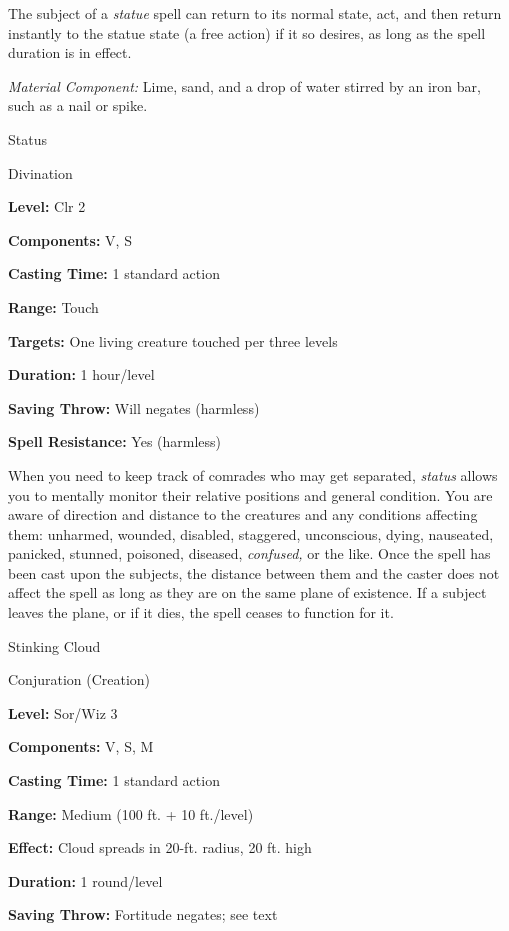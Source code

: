 \documentclass{article}
\begin{document}
The subject of a \textit{statue }spell can return to its normal state, act, and 
then return instantly to the statue state (a free action) if it so desires, as 
long as the spell duration is in effect.

\textit{Material Component: }Lime, sand, and a drop of water stirred by an iron 
bar, such as a nail or spike.

\vspace{12pt}
Status

Divination

\textbf{Level:} Clr 2

\textbf{Components:} V, S

\textbf{Casting Time:} 1 standard action

\textbf{Range:} Touch

\textbf{Targets:} One living creature touched per three levels

\textbf{Duration:} 1 hour/level

\textbf{Saving Throw: }Will negates (harmless)

\textbf{Spell Resistance:} Yes (harmless)

When you need to keep track of comrades who may get separated, \textit{status }allows 
you to mentally monitor their relative positions and general condition. You are 
aware of direction and distance to the creatures and any conditions affecting them: 
unharmed, wounded, disabled, staggered, unconscious, dying, nauseated, panicked, 
stunned, poisoned, diseased, \textit{confused, }or the like. Once the spell has 
been cast upon the subjects, the distance between them and the caster does not 
affect the spell as long as they are on the same plane of existence. If a subject 
leaves the plane, or if it dies, the spell ceases to function for it.

\vspace{12pt}
Stinking Cloud

Conjuration (Creation)

\textbf{Level:} Sor/Wiz 3

\textbf{Components:} V, S, M

\textbf{Casting Time:} 1 standard action

\textbf{Range: }Medium (100 ft. + 10 ft./level)

\textbf{Effect:} Cloud spreads in 20-ft. radius, 20 ft. high

\textbf{Duration:} 1 round/level

\textbf{Saving Throw:} Fortitude negates; see text
\end{document}
